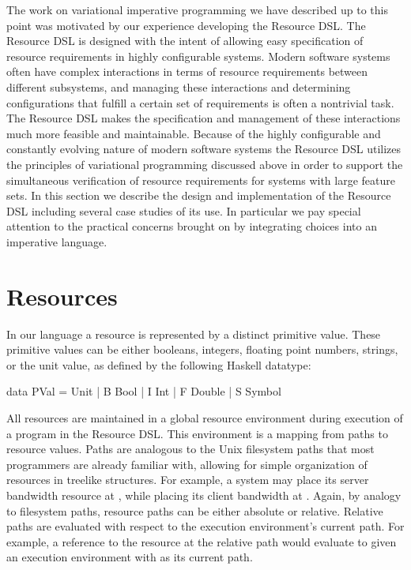 \documentclass[onehalf,11pt]{beavtex}
\begin{document}
The work on variational imperative programming we have described up to this point was motivated
by our experience developing the Resource DSL. The Resource DSL is designed with the intent of
allowing easy specification of resource requirements in highly configurable systems. Modern software
systems often have complex interactions in terms of resource requirements between different subsystems,
and managing these interactions and determining configurations that fulfill a certain set of requirements
is often a nontrivial task. The Resource DSL makes the specification and management
of these interactions much more feasible and maintainable. Because of the highly configurable and constantly evolving
nature of modern software systems the Resource DSL utilizes the principles of variational programming
discussed above in order to support the simultaneous verification of resource requirements for
systems with large feature sets. In this section we describe the design and implementation of the
Resource DSL including several case studies of its use. In particular we pay special attention to the
practical concerns brought on by integrating choices into an imperative language.

\section{Resources}

In our language a resource is represented by a distinct primitive value. These primitive values
can be either booleans, integers, floating point numbers, strings, or the unit value, as defined
by the following Haskell datatype:

\begin{program}
data PVal
     = Unit
     | B Bool
     | I Int
     | F Double
     | S Symbol
\end{program}

All resources are maintained in a global resource environment during execution of a program
in the Resource DSL. This environment is a mapping from paths to resource values. Paths are
analogous to the Unix filesystem paths that most programmers are already familiar with, allowing for
simple organization of resources in treelike structures. For example, a system may place its server
bandwidth resource at , while placing its client bandwidth at .
Again, by analogy to filesystem paths, resource paths can be either absolute or relative. Relative paths are
evaluated with respect to the execution environment's current path. For example, a reference to the resource
at the relative path  would evaluate to 
given an execution environment with  as its current path.
\end{document}
